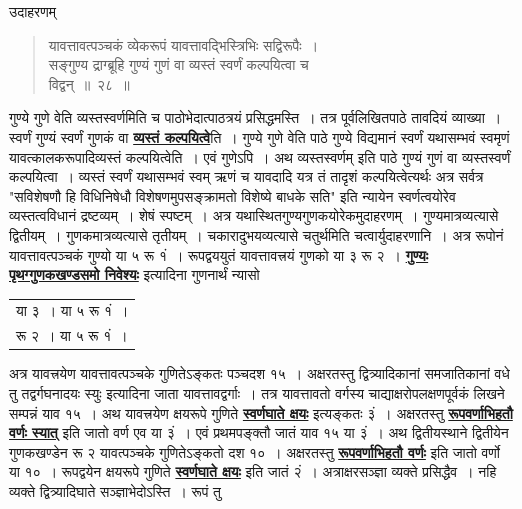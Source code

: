 \documentclass[11pt, openany]{book}
\begin{document}
\vspace{-2mm}
{\bqt उदाहरणम् }

 \label{28}
\begin{quote}
    \eg
    यावत्तावत्पञ्चकं व्येकरूपं यावत्तावद्भिस्त्रिभिः सद्विरूपैः~। \\
सङ्गुण्य द्राग्ब्रूहि गुण्यं गुणं वा व्यस्तं स्वर्णं कल्पयित्वा च\\
विद्वन्~॥~२८~॥
\end{quote}


गुण्ये गुणे वेति व्यस्तस्वर्णमिति च पाठोभेदात्पाठत्रयं प्रसिद्धमस्ति~।
तत्र पूर्वलिखितपाठे तावदियं व्याख्या~। स्वर्णं गुण्यं स्वर्णं गुणकं वा
\hyperref[28]{\textbf{व्यस्तं कल्पयित्वे}}ति~। गुण्ये गुणे वेति पाठे गुण्ये विद्यमानं स्वर्णं यथासम्भवं स्वमृणं यावत्कालकरूपादिव्यस्तं कल्पयित्वेति~। एवं गुणेऽपि~। अथ व्यस्तस्वर्णम् इति पाठे गुण्यं गुणं वा व्यस्तस्वर्णं कल्पयित्वा~। व्यस्तं स्वर्णं यथासम्भवं स्वम् ऋणं च यावदादि यत्र तं तादृशं कल्पयित्वेत्यर्थः अत्र सर्वत्र {\qt "सविशेषणौ हि विधिनिषेधौ
विशेषणमुपसङ्क्रामतो विशेष्ये बाधके सति"} इति न्यायेन स्वर्णत्वयोरेव
व्यस्तत्वविधानं द्रष्टव्यम्~। शेषं स्पष्टम्~। अत्र यथास्थितगुण्यगुणकयोरेकमुदाहरणम्~।
गुण्यमात्रव्यत्यासे द्वितीयम्~। गुणकमात्रव्यत्यासे तृतीयम्~। चकारादुभयव्यत्यासे चतुर्थमिति चत्वार्युदाहरणानि~। अत्र रूपोनं यावत्तावत्पञ्चकं गुण्यो या ५ रू १ं~। रूपद्वययुतं यावत्तावत्त्रयं गुणको या ३ रू २~। \hyperref[27]{\textbf{गुण्यः पृथग्गुणकखण्डसमो निवेश्यः}} इत्यादिना गुणनार्थं न्यासो
{\begin{tabular}{l}
या ३~। या ५ रू १ं~।\\
रू २~। या ५ रू १ं~।
\end{tabular}}
\noindent अत्र यावत्त्रयेण यावत्तावत्पञ्चके गुणितेऽङ्कतः पञ्चदश १५~। अक्षरतस्तु
द्वित्र्यादिकानां समजातिकानां वधे तु तद्वर्गघनादयः स्युः इत्यादिना
जाता यावत्तावद्वर्गाः~। तत्र यावत्तावतो वर्गस्य चाद्याक्षरोपलक्षणपूर्वकं
लिखने सम्पन्नं याव १५~। अथ यावत्त्रयेण क्षयरूपे गुणिते \hyperref[9]{\textbf{स्वर्णघाते क्षयः}} इत्यङ्कतः ३ं~।
अक्षरतस्तु \hyperref[26]{\textbf{रूपवर्णाभिहतौ वर्णः स्यात्}} इति जातो वर्ण एव या ३ं~। एवं प्रथमपङ्क्तौ
जातं याव
\afterpage{\fancyhead[LE,RO]{\thepage}}
\cfoot{}
\newpage
\noindent १५ या ३ं~। अथ द्वितीयस्थाने द्वितीयेन गुणकखण्डेन रू २ यावत्पञ्चके गुणितेऽङ्कतो दश १०~। अक्षरतस्तु \hyperref[26]{\textbf{रूपवर्णाभिहतौ वर्णः}}
इति जातो वर्णो या १०~। रूपद्वयेन क्षयरूपे गुणिते \hyperref[9]{\textbf{स्वर्णघाते क्षयः}} इति जातं २ं~।
अत्राक्षरसञ्ज्ञा व्यक्ते प्रसिद्धैव~। नहि व्यक्ते द्वित्र्यादिघाते सञ्ज्ञाभेदोऽस्ति~। रूपं तु
\end{document}
